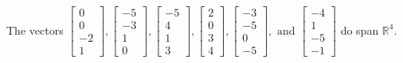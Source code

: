 \begin{exercise}
\begin{exerciseStatement}
  \end{exerciseStatement}
  \begin{exerciseAnswer}
   The vectors \(\left[\begin{array}{r}
0 \\
0 \\
-2 \\
1
\end{array}\right] , \left[\begin{array}{r}
-5 \\
-3 \\
1 \\
0
\end{array}\right] , \left[\begin{array}{r}
-5 \\
4 \\
1 \\
3
\end{array}\right] , \left[\begin{array}{r}
2 \\
0 \\
3 \\
4
\end{array}\right] , \left[\begin{array}{r}
-3 \\
-5 \\
0 \\
-5
\end{array}\right] , \text{ and } \left[\begin{array}{r}
-4 \\
1 \\
-5 \\
-1
\end{array}\right]\) 
  	 do  
	span \(\mathbb{R}^4\).
  


  \end{exerciseAnswer}
\end{exercise}